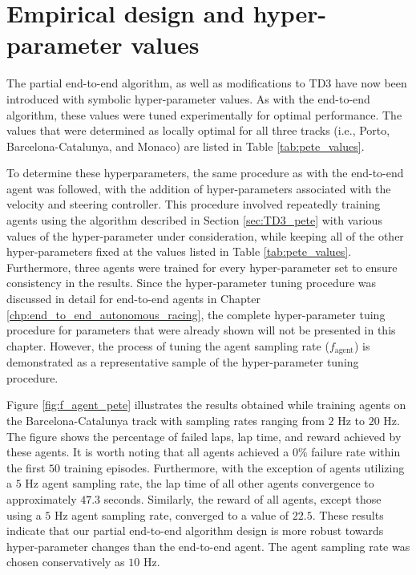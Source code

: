 \section{Empirical design and hyper-parameter values}

The partial end-to-end algorithm, as well as modifications to TD3 have now been introduced with symbolic hyper-parameter values.
As with the end-to-end algorithm, these values were tuned experimentally for optimal performance.
The values that were determined as locally optimal for all three tracks (i.e., Porto, Barcelona-Catalunya, and Monaco) are listed in Table \ref{tab:pete_values}.



To determine these hyperparameters, the same procedure as with the end-to-end agent was followed, 
with the addition of hyper-parameters associated with the velocity and steering controller.
This procedure involved repeatedly training agents using the algorithm described in Section \ref{sec:TD3_pete}
with various values of the hyper-parameter under consideration, while keeping all of the other hyper-parameters fixed at the values listed in Table \ref{tab:pete_values}.
Furthermore, three agents were trained for every hyper-parameter set to ensure consistency in the results.
Since the hyper-parameter tuning procedure was discussed in detail for end-to-end agents in Chapter \ref{chp:end_to_end_autonomous_racing}, the complete hyper-parameter tuing procedure for parameters that were already shown will not be presented in this chapter. 
However, the process of tuning the agent sampling rate ($f_{\text{agent}}$) is demonstrated as a representative sample of the hyper-parameter tuning procedure.


Figure \ref{fig:f_agent_pete} illustrates the results obtained while training agents on the Barcelona-Catalunya track with sampling rates ranging from $2$ Hz to $20$ Hz. 
The figure shows the percentage of failed laps, lap time, and reward achieved by these agents. 
It is worth noting that all agents achieved a $0\%$ failure rate within the first $50$ training episodes.
Furthermore, with the exception of agents utilizing a $5$ Hz agent sampling rate, the lap time of all other agents convergence to approximately $47.3$ seconds. 
Similarly, the reward of all agents, except those using a $5$ Hz agent sampling rate, converged to a value of $22.5$.
These results indicate that our partial end-to-end algorithm design is more robust towards hyper-parameter changes than the end-to-end agent.
The agent sampling rate was chosen conservatively as $10$ Hz.

